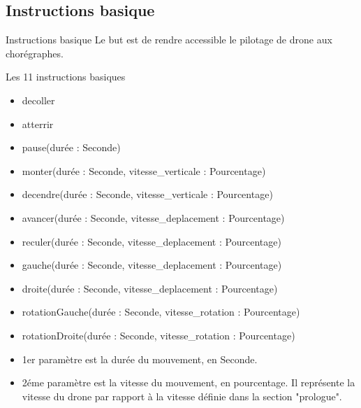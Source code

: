 \documentclass{bredelebeamer}
\begin{document}
	\subsection{Instructions basique} 
\begin{frame}{Instructions basique} 
Le but est de rendre accessible le pilotage de drone aux chorégraphes. 
\begin{block}{Les 11 instructions basiques}
\begin{itemize}
\item \alert{decoller}
\item \alert{atterrir}
\item \alert{pause(durée : Seconde)}
\item \alert{monter(durée : Seconde, vitesse\_verticale : Pourcentage)}
\item \alert{decendre(durée : Seconde, vitesse\_verticale : Pourcentage)}
\item \alert{avancer(durée : Seconde, vitesse\_deplacement : Pourcentage)}
\item \alert{reculer(durée : Seconde, vitesse\_deplacement : Pourcentage)}
\item \alert{gauche(durée : Seconde, vitesse\_deplacement : Pourcentage)}
\item \alert{droite(durée : Seconde, vitesse\_deplacement : Pourcentage)}
\item \alert{rotationGauche(durée : Seconde, vitesse\_rotation : Pourcentage)}
\item \alert{rotationDroite(durée : Seconde, vitesse\_rotation : Pourcentage)}
\end{itemize}
\end{block}
\begin{itemize}
\item 1er paramètre est la durée du mouvement, en Seconde.
\item 2éme paramètre est la vitesse du mouvement, en pourcentage. Il représente la vitesse du drone par rapport à la vitesse définie dans la section "prologue".
\end{itemize}
\end{frame}
\end{document}
